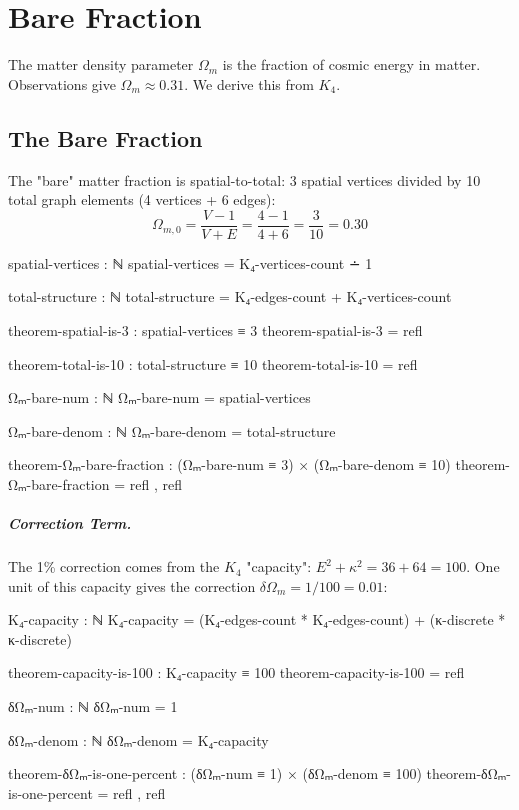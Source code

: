 \documentclass[11pt,a4paper]{book}
\begin{document}
\chapter{Bare Fraction}
\label{chap:matter-density-parameter}

The matter density parameter $\Omega_m$ is the fraction of cosmic energy in matter. 
Observations give $\Omega_m \approx 0.31$. We derive this from $K_4$.

\section{The Bare Fraction}

The "bare" matter fraction is spatial-to-total: 3 spatial vertices divided by 10 total 
graph elements (4 vertices + 6 edges):
\[
\Omega_{m,0} = \frac{V - 1}{V + E} = \frac{4 - 1}{4 + 6} = \frac{3}{10} = 0.30
\]

\begin{code}
spatial-vertices : ℕ
spatial-vertices = K₄-vertices-count ∸ 1

total-structure : ℕ
total-structure = K₄-edges-count + K₄-vertices-count

theorem-spatial-is-3 : spatial-vertices ≡ 3
theorem-spatial-is-3 = refl

theorem-total-is-10 : total-structure ≡ 10
theorem-total-is-10 = refl

Ωₘ-bare-num : ℕ
Ωₘ-bare-num = spatial-vertices

Ωₘ-bare-denom : ℕ
Ωₘ-bare-denom = total-structure

theorem-Ωₘ-bare-fraction : (Ωₘ-bare-num ≡ 3) × (Ωₘ-bare-denom ≡ 10)
theorem-Ωₘ-bare-fraction = refl , refl
\end{code}

\paragraph{Correction Term.}
The 1\% correction comes from the $K_4$ "capacity": $E^2 + \kappa^2 = 36 + 64 = 100$. 
One unit of this capacity gives the correction $\delta\Omega_m = 1/100 = 0.01$:

\begin{code}
K₄-capacity : ℕ
K₄-capacity = (K₄-edges-count * K₄-edges-count) + (κ-discrete * κ-discrete)

theorem-capacity-is-100 : K₄-capacity ≡ 100
theorem-capacity-is-100 = refl

δΩₘ-num : ℕ
δΩₘ-num = 1

δΩₘ-denom : ℕ
δΩₘ-denom = K₄-capacity

theorem-δΩₘ-is-one-percent : (δΩₘ-num ≡ 1) × (δΩₘ-denom ≡ 100)
theorem-δΩₘ-is-one-percent = refl , refl
\end{code}
\end{document}
